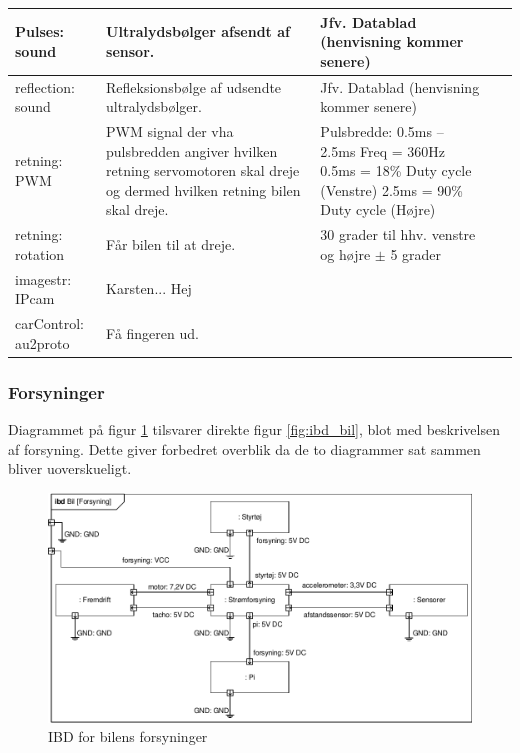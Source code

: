 \begin{table}[h]
\begin{tabularx}{\textwidth}{|l|Z|Z|Z|}
Pulses: sound
	& Ultralydsbølger afsendt af sensor. 
	& Jfv. Datablad (henvisning kommer senere) %
 	& ~
	\\ \hline
	
reflection: sound
	& Refleksionsbølge af udsendte ultralydsbølger. 
	& Jfv. Datablad (henvisning kommer senere) %
 	& ~
	\\ \hline
	
retning: PWM 
	& PWM signal der vha pulsbredden angiver hvilken retning servomotoren skal 				dreje og dermed hvilken retning bilen skal dreje. 
	& Pulsbredde: 0.5ms – 2.5ms \newline
		Freq = 360Hz \newline
		0.5ms = 18\% Duty cycle (Venstre)\newline
		2.5ms = 90\% Duty cycle (Højre)
	& ~
	\\ \hline

retning: rotation
	& Får bilen til at dreje.
	& 30 grader til hhv. venstre og højre $\pm$ 5 grader
	& ~
	\\ \hline
	
imagestr: IPcam
	& Karsten... Hej%
	& ~ 
	& ~
	\\ \hline

carControl: au2proto
	& Få fingeren ud. %
	& ~
	& ~
	\\ \hline

	\end{tabularx}
	\label{tbl:bil_signaler}
\end{table}

\clearpage

\subsubsection{Forsyninger} %

Diagrammet på figur \ref{fig:ibd_bil_forsyning} tilsvarer direkte figur \ref{fig:ibd_bil}, blot med beskrivelsen af forsyning. Dette giver forbedret overblik da de to diagrammer sat sammen bliver uoverskueligt.  

\begin{figure}[h]
\centering
\includegraphics[width=\textwidth]{../fig/diagrammer/bil/ibd_bil_forsyning.pdf}
\caption{IBD for bilens forsyninger}
\label{fig:ibd_bil_forsyning}
\end{figure}

